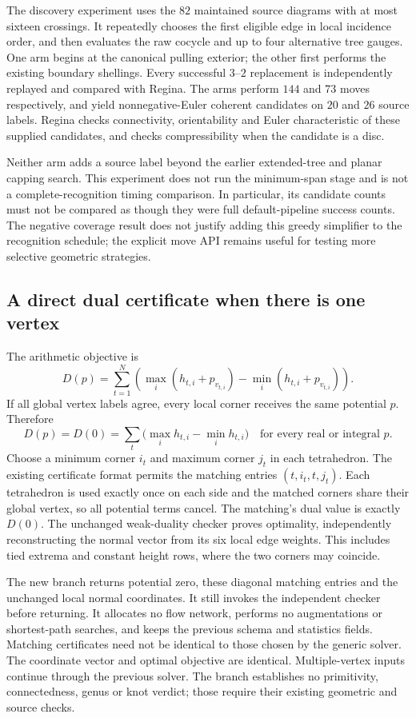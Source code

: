 The discovery experiment uses the $82$ maintained source diagrams with at
most sixteen crossings. It repeatedly chooses the first eligible edge in
local incidence order, and then evaluates the raw cocycle and up to four
alternative tree gauges. One arm begins at the canonical pulling exterior;
the other first performs the existing boundary shellings. Every successful
$3$--$2$ replacement is independently replayed and compared with Regina.
The arms perform $144$ and $73$ moves respectively, and yield nonnegative-Euler
coherent candidates on $20$ and $26$ source labels. Regina checks connectivity,
orientability and Euler characteristic of these supplied candidates, and
checks compressibility when the candidate is a disc.

Neither arm adds a source label beyond the earlier extended-tree and planar
capping search. This experiment does not run the minimum-span stage and is
not a complete-recognition timing comparison. In particular, its candidate
counts must not be compared as though they were full default-pipeline success
counts. The negative coverage result does not justify adding this greedy
simplifier to the recognition schedule; the explicit move API remains useful
for testing more selective geometric strategies.

\subsection{A direct dual certificate when there is one vertex}

The arithmetic objective is
\[
 D(p)=\sum_{t=1}^N\left(\max_i(h_{t,i}+p_{v_{t,i}})
                         -\min_i(h_{t,i}+p_{v_{t,i}})\right).
\]
If all global vertex labels agree, every local corner receives the same
potential $p$. Therefore
\[
 D(p)=D(0)=\sum_t\bigl(\max_i h_{t,i}-\min_i h_{t,i}\bigr)
 \quad\text{for every real or integral }p.
\]
Choose a minimum corner $i_t$ and maximum corner $j_t$ in each tetrahedron.
The existing certificate format permits the matching entries
$(t,i_t,t,j_t)$. Each tetrahedron is used exactly once on each side and the
matched corners share their global vertex, so all potential terms cancel.
The matching's dual value is exactly $D(0)$. The unchanged weak-duality
checker proves optimality, independently reconstructing the normal vector
from its six local edge weights. This includes tied extrema and constant
height rows, where the two corners may coincide.

The new branch returns potential zero, these diagonal matching entries and
the unchanged local normal coordinates. It still invokes the independent
checker before returning. It allocates no flow network, performs no
augmentations or shortest-path searches, and keeps the previous schema and
statistics fields. Matching certificates need not be identical to those
chosen by the generic solver. The coordinate vector and optimal objective
are identical. Multiple-vertex inputs continue through the previous solver.
The branch establishes no primitivity, connectedness, genus or knot verdict;
those require their existing geometric and source checks.

